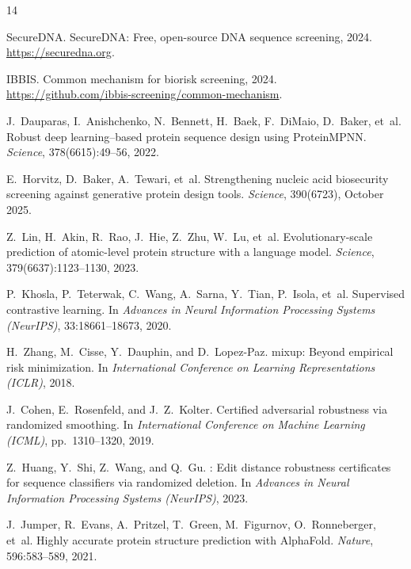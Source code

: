 \documentclass[11pt,a4paper]{article}
\begin{document}
\begin{thebibliography}{14}

SecureDNA.
\newblock SecureDNA: Free, open-source DNA sequence screening, 2024.
\newblock \url{https://securedna.org}.

IBBIS.
\newblock Common mechanism for biorisk screening, 2024.
\newblock \url{https://github.com/ibbis-screening/common-mechanism}.

J.~Dauparas, I.~Anishchenko, N.~Bennett, H.~Baek, F.~DiMaio, D.~Baker, et~al.
\newblock Robust deep learning--based protein sequence design using {ProteinMPNN}.
\newblock \emph{Science}, 378(6615):49--56, 2022.

E.~Horvitz, D.~Baker, A.~Tewari, et~al.
\newblock Strengthening nucleic acid biosecurity screening against generative protein design tools.
\newblock \emph{Science}, 390(6723), October 2025.

Z.~Lin, H.~Akin, R.~Rao, J.~Hie, Z.~Zhu, W.~Lu, et~al.
\newblock Evolutionary-scale prediction of atomic-level protein structure with a language model.
\newblock \emph{Science}, 379(6637):1123--1130, 2023.

P.~Khosla, P.~Teterwak, C.~Wang, A.~Sarna, Y.~Tian, P.~Isola, et~al.
\newblock Supervised contrastive learning.
\newblock In \emph{Advances in Neural Information Processing Systems (NeurIPS)}, 33:18661--18673, 2020.

H.~Zhang, M.~Cisse, Y.~Dauphin, and D.~Lopez-Paz.
\newblock mixup: Beyond empirical risk minimization.
\newblock In \emph{International Conference on Learning Representations (ICLR)}, 2018.

J.~Cohen, E.~Rosenfeld, and J.~Z.~Kolter.
\newblock Certified adversarial robustness via randomized smoothing.
\newblock In \emph{International Conference on Machine Learning (ICML)}, pp.~1310--1320, 2019.

Z.~Huang, Y.~Shi, Z.~Wang, and Q.~Gu.
: Edit distance robustness certificates for sequence classifiers via randomized deletion.
\newblock In \emph{Advances in Neural Information Processing Systems (NeurIPS)}, 2023.

J.~Jumper, R.~Evans, A.~Pritzel, T.~Green, M.~Figurnov, O.~Ronneberger, et~al.
\newblock Highly accurate protein structure prediction with {AlphaFold}.
\newblock \emph{Nature}, 596:583--589, 2021.


\end{thebibliography}
\end{document}
